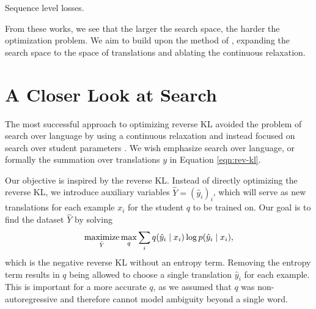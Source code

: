 \documentclass[11pt]{article}
\begin{document}
Sequence level losses.

From these works, we see that the larger the search space, the harder the optimization problem.
We aim to build upon the method of \citet{engine}, expanding the search space
to the space of translations and ablating the continuous relaxation.

\section{A Closer Look at Search}
The most successful approach to optimizing reverse KL avoided the problem of search over language
by using a continuous relaxation and instead focused on search over student parameters
\citep{engine}.
We wish emphasize search over language, or formally the summation over translations
$y$ in Equation \ref{eqn:rev-kl}.

Our objective is inspired by the reverse KL.
Instead of directly optimizing the reverse KL,
we introduce auxiliary variables $\hat{Y} = (\hat{y}_i)_i$,
which will serve as new translations for each example $x_i$
for the student $q$ to be trained on.
Our goal is to find the dataset $\hat{Y}$ by solving
\begin{equation}
    \label{eqn:blah}
    \operatorname*{maximize}_{\hat{Y}} \max_q \sum_i  q(\hat{y}_i \mid x_i) \log p(\hat{y}_i \mid x_i),
\end{equation}
which is the negative reverse KL without an entropy term.
Removing the entropy term results in $q$ being allowed to choose
a single translation $\hat{y}_i$ for each example.
This is important for a more accurate $q$,
as we assumed that $q$ was non-autoregressive
and therefore cannot model ambiguity beyond a single word.

\end{document}
